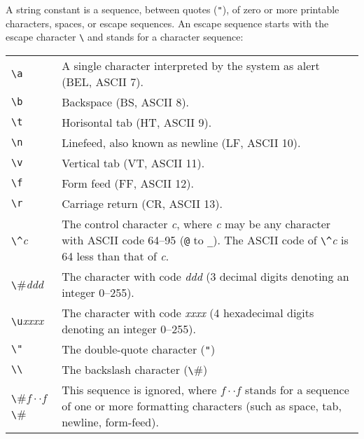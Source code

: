 \documentclass[fleqn,a4paper]{article}
\begin{document}
A string constant is a sequence, between quotes (\verb#"#), of zero or
more printable characters, spaces, or escape sequences.  An escape
sequence starts with the escape character \verb#\# and stands for a
character sequence:

\begin{quot}
\begin{tabular}{@{}lp{5in}}
  \verb#\a# & A single character interpreted by the system as
  alert (BEL, ASCII 7). \\ 

  \verb#\b# & Backspace (BS, ASCII 8).\\ 

  \verb#\t# & Horisontal tab (HT, ASCII 9).\\ 

  \verb#\n# & Linefeed, also known as newline (LF, ASCII 10). \\ 

  \verb#\v# & Vertical tab (VT, ASCII 11).\\ 

  \verb#\f# & Form feed (FF, ASCII 12).\\ 
 
 \verb#\r# & Carriage return (CR, ASCII 13).\\ 

  \verb#\^#{\it c\/} & The control character {\it c\/}, where {\it
    c\/} may be any character with ASCII code 64--95 (\verb#@# to
  \verb#_#).  The ASCII code of \verb#\^#{\it c\/} is 64 less than
  that of {\it c\/}.\\ 

  \verb#\#{\it ddd\/} & The character with code {\it ddd\/} (3 decimal
  digits denoting an integer 0--255).\\ 

  \verb#\u#{\it xxxx\/} & The character with code {\it xxxx\/} (4 hexadecimal
  digits denoting an integer 0--255).\\ 

\verb#\"# & The double-quote character ({\tt "})\\

\verb#\\# & The backslash character (\verb#\#)\\

\verb#\#$f\cdot\cdot f$\verb#\# & This sequence is ignored, where
$f\cdot\cdot f$ stands for a sequence of one or more formatting
characters (such as space, tab, newline, form-feed).
\end{tabular}
\end{quot}
\end{document}
